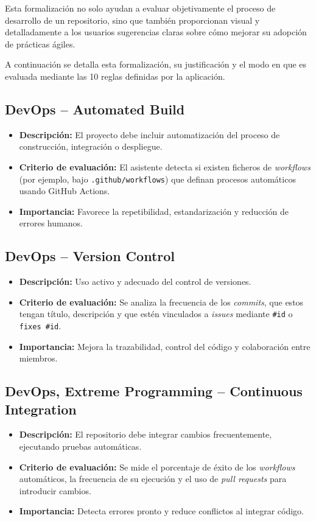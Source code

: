 Esta formalización no solo ayudan a evaluar objetivamente el proceso de desarrollo de un repositorio, sino que también proporcionan visual y detalladamente a los usuarios sugerencias claras sobre cómo mejorar su adopción de prácticas ágiles.

A continuación se detalla esta formalización, su justificación y el modo en que es evaluada mediante las 10 reglas definidas por la aplicación.

\subsection{DevOps – Automated Build}

\begin{itemize}
  \item \textbf{Descripción:} El proyecto debe incluir automatización del proceso de construcción, integración o despliegue.
  \item \textbf{Criterio de evaluación:} El asistente detecta si existen ficheros de \textit{workflows} (por ejemplo, bajo \texttt{.github/workflows}) que definan procesos automáticos usando GitHub Actions.
  \item \textbf{Importancia:} Favorece la repetibilidad, estandarización y reducción de errores humanos.
\end{itemize}

\subsection{DevOps – Version Control}

\begin{itemize}
  \item \textbf{Descripción:} Uso activo y adecuado del control de versiones.
  \item \textbf{Criterio de evaluación:} Se analiza la frecuencia de los \textit{commits}, que estos tengan título, descripción y que estén vinculados a \textit{issues} mediante \texttt{\#id} o \texttt{fixes \#id}.
  \item \textbf{Importancia:} Mejora la trazabilidad, control del código y colaboración entre miembros.
\end{itemize}

\subsection{DevOps, Extreme Programming – Continuous Integration}

\begin{itemize}
  \item \textbf{Descripción:} El repositorio debe integrar cambios frecuentemente, ejecutando pruebas automáticas.
  \item \textbf{Criterio de evaluación:} Se mide el porcentaje de éxito de los \textit{workflows} automáticos, la frecuencia de su ejecución y el uso de \textit{pull requests} para introducir cambios.
  \item \textbf{Importancia:} Detecta errores pronto y reduce conflictos al integrar código.
\end{itemize}

